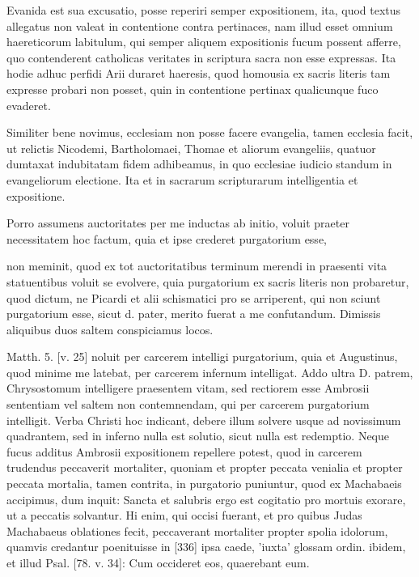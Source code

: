 Evanida est sua excusatio, posse reperiri semper expositionem, ita, quod textus allegatus non valeat in contentione contra pertinaces, nam illud esset omnium haereticorum labitulum, qui semper aliquem expositionis fucum possent afferre, quo contenderent catholicas veritates in scriptura sacra non esse expressas. Ita hodie adhuc perfidi Arii duraret haeresis, quod homousia ex sacris literis tam expresse probari non posset, quin in contentione pertinax qualicunque fuco evaderet.

Similiter bene novimus, ecclesiam non posse facere evangelia, tamen ecclesia facit, ut relictis Nicodemi, Bartholomaei, Thomae et aliorum evangeliis, quatuor dumtaxat indubitatam fidem adhibeamus, in quo ecclesiae iudicio standum in evangeliorum electione. Ita et in sacrarum scripturarum intelligentia et expositione.

Porro assumens auctoritates per me inductas ab initio, voluit praeter necessitatem hoc factum, quia et ipse crederet purgatorium esse,

non meminit, quod ex tot auctoritatibus terminum merendi in praesenti vita statuentibus voluit se evolvere, quia purgatorium ex sacris literis non probaretur, quod dictum, ne Picardi et alii schismatici pro se arriperent, qui non sciunt purgatorium esse, sicut d. pater, merito fuerat a me confutandum. Dimissis aliquibus duos saltem conspiciamus locos.

Matth. 5. [v. 25] noluit per carcerem intelligi purgatorium, quia et Augustinus, quod minime me latebat, per carcerem infernum intelligat. Addo ultra D. patrem, Chrysostomum intelligere praesentem vitam, sed rectiorem esse Ambrosii sententiam vel saltem non contemnendam, qui per carcerem purgatorium intelligit. Verba Christi hoc indicant, debere illum solvere usque ad novissimum quadrantem, sed in inferno nulla est solutio, sicut nulla est redemptio. Neque fucus additus Ambrosii expositionem repellere potest, quod in carcerem trudendus peccaverit mortaliter, quoniam et propter peccata venialia et propter peccata mortalia, tamen contrita, in purgatorio puniuntur, quod ex Machabaeis accipimus, dum inquit: Sancta et salubris ergo est cogitatio pro mortuis exorare, ut a peccatis solvantur. Hi enim, qui occisi fuerant, et pro quibus Judas Machabaeus oblationes fecit, peccaverant mortaliter propter spolia idolorum, quamvis credantur poenituisse in [336] ipsa caede, 'iuxta' glossam ordin. ibidem, et illud Psal. [78. v. 34]: Cum occideret eos, quaerebant eum.

